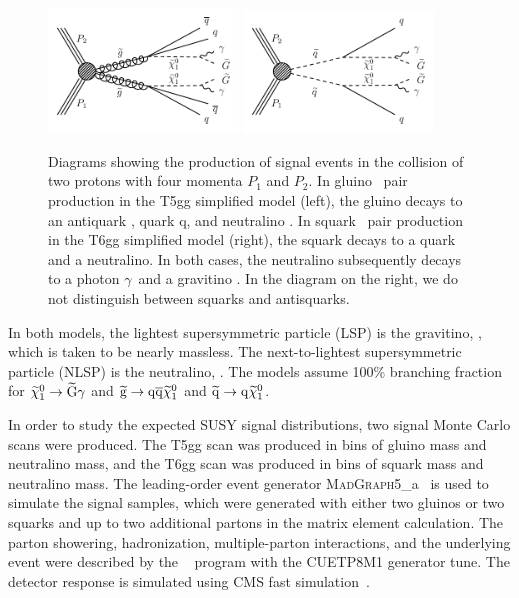 \begin{figure}[htbp]
    \centering
    \includegraphics[width=0.45\textwidth]{Figures/Results/gluinoDecay.pdf}
    \includegraphics[width=0.45\textwidth]{Figures/Results/squarkDecay.pdf}
    \caption{Diagrams showing the production of signal events in the collision
        of two protons with four momenta ${P}_{1}$ and ${P}_{2}$. In gluino
        \gluino~pair production in the T5gg simplified model (left), the gluino
       decays to an antiquark \antiquark, quark q, and neutralino \neutralino. In
        squark \squark~pair production in the T6gg simplified model (right), the
        squark decays to a quark and a neutralino. In both cases, the
        neutralino subsequently decays to a photon $\gamma$~and a gravitino \gravitino.
        In the diagram on the right, we do not distinguish between squarks and
        antisquarks.}
    \label{fig:gluinoSquarkDecay}
\end{figure}

In both models, the lightest supersymmetric particle (LSP) is the gravitino, \gravitino, which is taken to be nearly massless. The next-to-lightest supersymmetric particle (NLSP) is the neutralino, \neutralino. The models assume 100\% branching fraction for 
$\widetilde{\chi}^{0}_{1}\rightarrow\widetilde{\mathrm{G}}\gamma$ and 
$\widetilde{\mathrm{g}}\rightarrow \mathrm{q} \overline{\mathrm{q}} \widetilde{\chi}^{0}_{1}$ and 
$\widetilde{\mathrm{q}}\rightarrow \mathrm{q} \widetilde{\chi}^{0}_{1}$.

In order to study the expected SUSY signal distributions, two
signal Monte Carlo scans were produced.
The T5gg scan was produced in bins of gluino mass and neutralino mass,
and the T6gg scan was produced in bins of squark mass and neutralino mass.
The leading-order event generator \textsc{MadGraph}5\_a\MCATNLO~\cite{Alwall:2014hca}
is used to simulate the signal samples, which
were generated with either two gluinos or two squarks and up to two additional
partons in the matrix element calculation. The parton showering, hadronization,
multiple-parton interactions, and the underlying event were described by the
~\cite{Sjostrand:2007gs} program with the CUETP8M1 generator tune.
The detector response is simulated using
CMS fast simulation~\cite{Abdullin:2011zz}.

